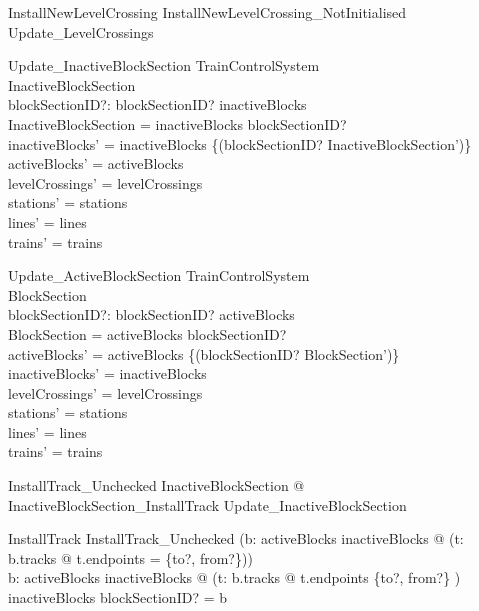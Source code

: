 \begin{zed}
InstallNewLevelCrossing  InstallNewLevelCrossing\_NotInitialised \semi  Update\_LevelCrossings
\end{zed}

\begin{schema}{Update\_InactiveBlockSection}
  \Delta TrainControlSystem\\
  \Delta InactiveBlockSection\\
  blockSectionID?: \nat 
\where
  blockSectionID? \in  \dom  inactiveBlocks\\
  \theta  InactiveBlockSection = inactiveBlocks blockSectionID?\\
  inactiveBlocks' = inactiveBlocks \oplus  \{(blockSectionID? \mapsto  \theta  InactiveBlockSection')\}\\
  activeBlocks' = activeBlocks\\
  levelCrossings' = levelCrossings\\
  stations' = stations\\
  lines' = lines\\
  trains' = trains
\end{schema}

\begin{schema}{Update\_ActiveBlockSection}
  \Delta TrainControlSystem\\
  \Delta BlockSection\\
  blockSectionID?: \nat 
\where
  blockSectionID? \in  \dom  activeBlocks\\
  \theta  BlockSection = activeBlocks blockSectionID?\\
  activeBlocks' = activeBlocks \oplus  \{(blockSectionID? \mapsto  \theta  BlockSection')\}\\
  inactiveBlocks' = inactiveBlocks\\
  levelCrossings' = levelCrossings\\
  stations' = stations\\
  lines' = lines\\
  trains' = trains
\end{schema}

\begin{zed}
InstallTrack\_Unchecked  \exists  \Delta InactiveBlockSection @ InactiveBlockSection\_InstallTrack \land  Update\_InactiveBlockSection
\end{zed}

\begin{schema}{InstallTrack}
  InstallTrack\_Unchecked
\where
  \lnot  (\exists  b: \ran  activeBlocks \cup  \ran  inactiveBlocks @ (\exists  t: b.tracks @ t.endpoints = \{to?, from?\}))\\
  \forall  b: \ran  activeBlocks \cup  \ran  inactiveBlocks @ (\exists  t: b.tracks @ t.endpoints \cap  \{to?, from?\} \neq  \emptyset) \implies  inactiveBlocks blockSectionID? = b
\end{schema}

